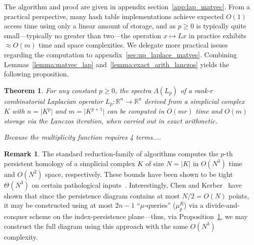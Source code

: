 \documentclass[10pt]{article}
\numberwithin{equation}{section}
\newcommand{\+}{%
	\raisebox{0.18ex}{\scaleobj{0.55}{+}}
}
\newtheorem{theorem}{Theorem}
\theoremstyle{definition}
\newtheorem{remark}{Remark}
\theoremstyle{definition}
\begin{document}
\noindent The algorithm and proof are given in appendix section~\ref{app:lap_matvec}. From a practical perspective, many hash table implementations achieve expected $O(1)$ access time using only a linear amount of storage, and as $p \geq 0$ is typically quite small---typically no greater than two---the operation $x \mapsto L x$ in practice exhibits $\approx O(m)$ time and space complexities. 
We delegate more practical issues regarding the computation to appendix~\ref{sec:up_laplace_matvec}.
Combining Lemmas~\ref{lemma:matvec_lap} and~\ref{lemma:exact_arith_lanczos} yields the following proposition. 
\begin{theorem}\label{prop:spectral_rank_complexity}
	For any constant $p \geq 0$, the spectra $\Lambda(L_p)$ of a rank-$r$ combinatorial Laplacian operator $L_p: \mathbb{R}^n \to \mathbb{R}^n$ derived from a simplicial complex $K$ with $n = \lvert K^p \rvert$ and $m = \lvert K^{p+1} \rvert$ can be computed in $O(mr)$ time and $O(m)$ storage via the Lanczos iteration, when carried out in exact arithmetic. 
	
	Because the multiplicity function requires 4 terms.... 
\end{theorem}

\begin{remark}
	The standard reduction-family of algorithms computes the $p$-th persistent homology of a simplicial complex $K$ of size $N = \lvert K \rvert$ in $O(N^3)$ time and $O(N^2)$ space, respectively. 
	These bounds have been shown to be tight $\Theta(N^3)$ on certain pathological inputs~\cite{}. 
	Interestingly, Chen and Kerber~\cite{chen2011output} have shown that since the persistence diagram contains at most $N/2 = O(N)$ points, it may be constructed using at most $2n - 1$ ``$\mu$-queries'' ($\mu_p^R$) via a divide-and-conquer scheme on the index-persistence plane---thus, via Proposition~\ref{prop:spectral_rank_complexity}, we may construct the full diagram using this approach with the same $O(N^3)$ complexity.  
\end{remark}
\end{document}
